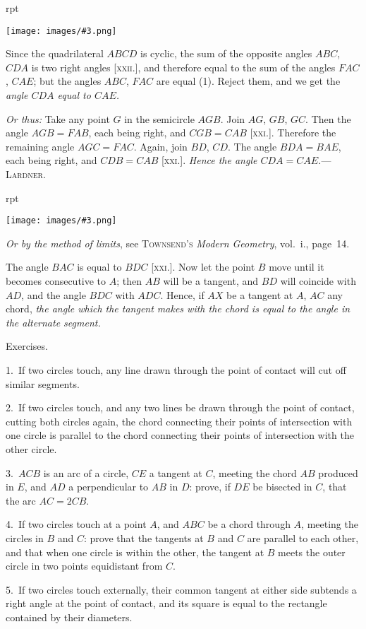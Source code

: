 \documentclass[oneside]{book}
\newcounter{wrapwidth}
\newcommand\exhead[1]{
\Needspace*{5\baselineskip}\begin{center}
\textsf{#1}
\end{center}
}
\newcommand\imgflow[3]{
\setcounter{wrapwidth}{#1}
\begin{wrapfigure}[#2]{r}{\value{wrapwidth}pt}
\begin{center}
\vspace{-0.3in}
\texttt{[image: images/\#3.png]}
\end{center}
\end{wrapfigure}
}
\begin{document}
\imgflow{130}{12}{f139}

Since the quadrilateral $ABCD$ is cyclic, the sum of
the opposite angles $ABC$, $CDA$ is two right angles
[\textsc{xxii.}], and therefore equal to the sum of the angles
$FAC$, $CAE$; but the angles $ABC$, $FAC$ are equal (1).
Reject them, and we get the \emph{angle $CDA$ equal to
$CAE$.}

\emph{Or thus:} Take any point
$G$ in the semicircle $AGB$.
Join $AG$, $GB$, $GC$. Then the
angle $AGB = FAB$, each being
right, and $CGB = CAB$ [\textsc{xxi.}].
Therefore the remaining angle
$AGC = FAC$. Again, join $BD$,
$CD$. The angle $BDA = BAE$,
each being right, and $CDB
= CAB$ [\textsc{xxi.}]. \emph{Hence the angle
$CDA = CAE$.}---\textsc{Lardner}.

\imgflow{120}{9}{f140}

\textit{Or by the method of limits}, see \textsc{Townsend's} \emph{Modern
Geometry}, vol.~i., page~14.

The angle $BAC$ is equal to
$BDC$ [\textsc{xxi.}]. Now let the point
$B$ move until it becomes consecutive
to $A$; then $AB$ will be
a tangent, and $BD$ will coincide
with $AD$, and the angle $BDC$
with $ADC$. Hence, if $AX$ be
a tangent at $A$, $AC$ any chord,
\emph{the angle which the tangent makes with the chord is equal
to the angle in the alternate segment.}

\exhead{Exercises.}

\begin{footnotesize}
1.~If two circles touch, any line drawn through the point of
contact will cut off similar segments.

2.~If two circles touch, and any two lines be drawn through the
point of contact, cutting both circles again, the chord connecting
their points of intersection with one circle is parallel to the chord
connecting their points of intersection with the other circle.

3.~$ACB$ is an arc of a circle, $CE$ a tangent at $C$, meeting the
chord $AB$ produced in $E$, and $AD$ a perpendicular to $AB$ in $D$:
prove, if $DE$ be bisected in $C$, that the arc $AC = 2CB$.

4.~If two circles touch at a point $A$, and $ABC$ be a chord
through $A$, meeting the circles in $B$ and $C$: prove that the tangents
at $B$ and $C$ are parallel to each other, and that when one
circle is within the other, the tangent at $B$ meets the outer circle
in two points equidistant from $C$.

5.~If two circles touch externally, their common tangent at
either side subtends a right angle at the point of contact, and its
square is equal to the rectangle contained by their diameters.
\par\end{footnotesize}
\end{document}
